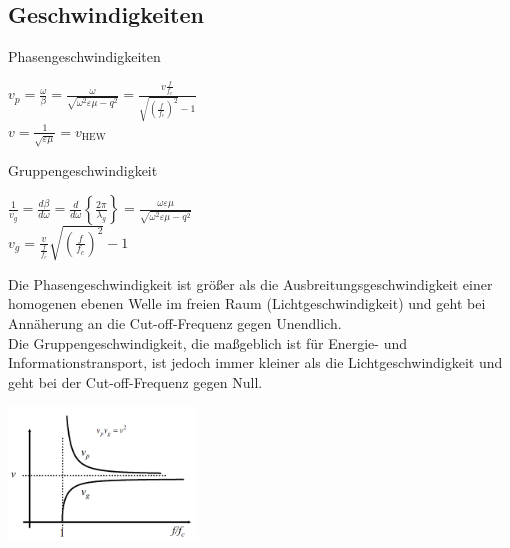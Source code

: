 \documentclass[english]{latex4ei/latex4ei_sheet}
\begin{document}
\begin{sectionbox}
	\subsection{Geschwindigkeiten}
	\vspace{1em}
	Phasengeschwindigkeiten
	\begin{emphbox}
		$v_{p}=\frac{\omega}{\beta}=\frac{\omega}{\sqrt{\omega^{2} \varepsilon \mu-q^{2}}}=\frac{v \frac{f}{f_{c}}}{\sqrt{\left(\frac{f}{f_{c}}\right)^{2}}-1}$\\
		$v=\frac{1}{\sqrt{\varepsilon \mu}}=v_{\mathrm{HEW}}$
	\end{emphbox}
	Gruppengeschwindigkeit
	\begin{emphbox}
		$\frac{1}{v_{g}}=\frac{d \beta}{d \omega}=\frac{d}{d \omega}\left\{\frac{2 \pi}{\lambda_{g}}\right\}=\frac{\omega \varepsilon \mu}{\sqrt{\omega^{2} \varepsilon \mu-q^{2}}}$\\
		$v_{g}=\frac{v}{\frac{f}{f_{c}}} \sqrt{\left(\frac{f}{f_{c}}\right)^{2}}-1$
	\end{emphbox}
	Die Phasengeschwindigkeit ist größer als die Ausbreitungsgeschwindigkeit einer homogenen ebenen Welle im freien Raum (Lichtgeschwindigkeit) und geht bei Annäherung an die Cut-off-Frequenz gegen Unendlich.\\
	Die Gruppengeschwindigkeit, die maßgeblich ist für Energie- und Informationstransport, ist jedoch immer kleiner als die Lichtgeschwindigkeit und geht bei der Cut-off-Frequenz gegen Null.
	\begin{center}\includegraphics[width = 5cm]{./img/geschwindigkeiten.png}\end{center}
\end{sectionbox}
\end{document}
